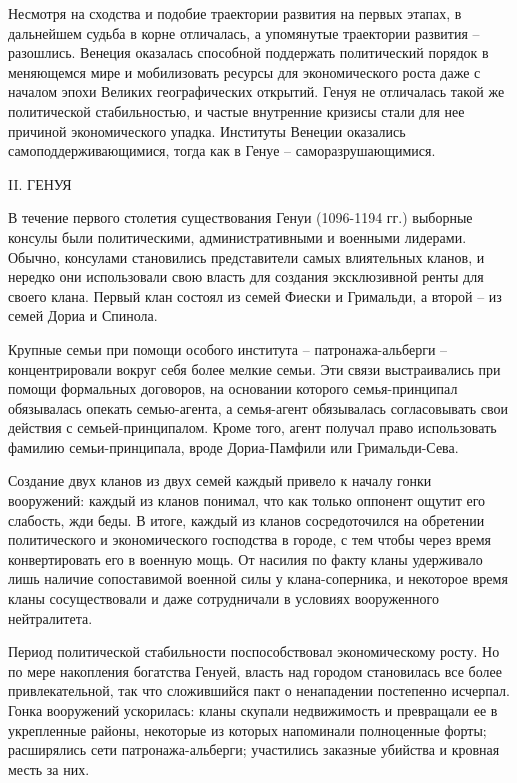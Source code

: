 Несмотря на сходства и подобие траектории развития на первых этапах, в
дальнейшем судьба в корне отличалась, а упомянутые траектории развития –
разошлись. Венеция оказалась способной поддержать политический порядок в
меняющемся мире и мобилизовать ресурсы для экономического роста даже с началом
эпохи Великих географических открытий. Генуя не отличалась такой же
политической стабильностью, и частые внутренние кризисы стали для нее причиной
экономического упадка. Институты Венеции оказались самоподдерживающимися, тогда
как в Генуе – саморазрушающимися.

II. ГЕНУЯ

В течение первого столетия существования Генуи (1096-1194 гг.) выборные консулы
были политическими, административными и военными лидерами. Обычно, консулами
становились представители самых влиятельных кланов, и нередко они использовали
свою власть для создания эксклюзивной ренты для своего клана. Первый клан
состоял из семей Фиески и Гримальди, а второй – из семей Дориа и Спинола.

Крупные семьи при помощи особого института – патронажа-альберги –
концентрировали вокруг себя более мелкие семьи. Эти связи выстраивались при
помощи формальных договоров, на основании которого семья-принципал обязывалась
опекать семью-агента, а семья-агент обязывалась согласовывать свои действия с
семьей-принципалом. Кроме того, агент получал право использовать фамилию
семьи-принципала, вроде Дориа-Памфили или Гримальди-Сева.

Создание двух кланов из двух семей каждый привело к началу гонки вооружений:
каждый из кланов понимал, что как только оппонент ощутит его слабость, жди
беды. В итоге, каждый из кланов сосредоточился на обретении политического и
экономического господства в городе, с тем чтобы через время конвертировать его
в военную мощь. От насилия по факту кланы удерживало лишь наличие сопоставимой
военной силы у клана-соперника, и некоторое время кланы сосуществовали и даже
сотрудничали в условиях вооруженного нейтралитета.

Период политической стабильности поспособствовал экономическому росту. Но по
мере накопления богатства Генуей, власть над городом становилась все более
привлекательной, так что сложившийся пакт о ненападении постепенно исчерпал.
Гонка вооружений ускорилась: кланы скупали недвижимость и превращали ее в
укрепленные районы, некоторые из которых напоминали полноценные форты;
расширялись сети патронажа-альберги; участились заказные убийства и кровная
месть за них.

